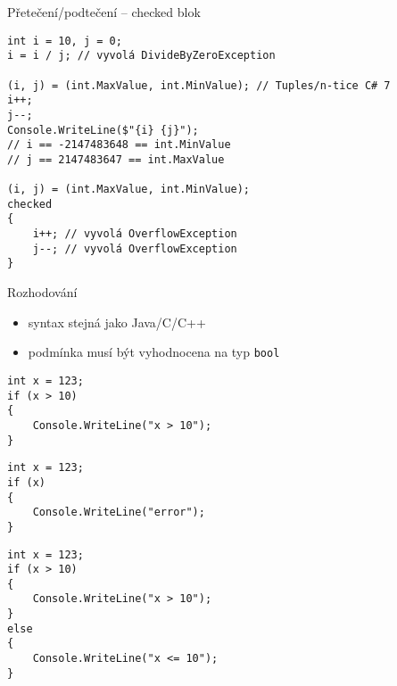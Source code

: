 \begin{frame}[fragile]
\begin{bonusblock}{Přetečení/podtečení -- checked blok}
\begin{lstlisting}
int i = 10, j = 0;
i = i / j; // vyvolá DivideByZeroException

(i, j) = (int.MaxValue, int.MinValue); // Tuples/n-tice C# 7
i++;
j--;
Console.WriteLine($"{i} {j}");
// i == -2147483648 == int.MinValue
// j == 2147483647 == int.MaxValue

(i, j) = (int.MaxValue, int.MinValue);
checked
{
    i++; // vyvolá OverflowException
    j--; // vyvolá OverflowException
}
\end{lstlisting}
\end{bonusblock}
\end{frame}





\begin{frame}[fragile]
\begin{block}{Rozhodování}
\begin{itemize}
\item syntax stejná jako Java/C/C++
\item podmínka musí být vyhodnocena na typ \lstinline|bool|
\end{itemize}
\end{block}
\begin{yesblock}
\begin{lstlisting}
int x = 123;
if (x > 10)
{
    Console.WriteLine("x > 10");
}
\end{lstlisting}
\end{yesblock}

\begin{noblock}
\begin{lstlisting}
int x = 123;
if (x)
{
    Console.WriteLine("error");
}
\end{lstlisting}
\end{noblock}
\end{frame}

\begin{frame}[fragile]
\begin{yesblock}
\begin{lstlisting}
int x = 123;
if (x > 10)
{
    Console.WriteLine("x > 10");
}
else
{
    Console.WriteLine("x <= 10");
}
\end{lstlisting}
\end{yesblock}
\end{frame}





